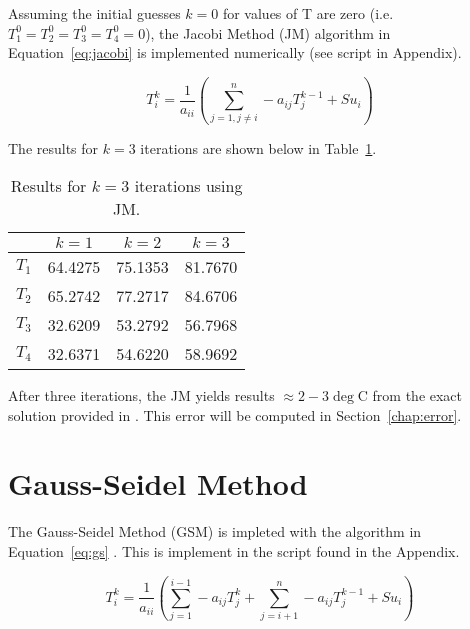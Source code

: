 Assuming the initial guesses $k=0$ for values of T are zero (i.e. $T_1^0=T_2^0=T_3^0=T_4^0=0$), the Jacobi Method (JM) algorithm in Equation~\ref{eq:jacobi} \cite{cfdbook} is implemented numerically (see script \cite{python} in Appendix).

\begin{equation}
	\label{eq:jacobi}	
	T_i^k = \frac{1}{a_{ii}} \left( \sum_{j=1, j \neq i}^{n} - a_{ij} T_j^{k-1}  + Su_i \right)
\end{equation}

The results for $k=3$ iterations are shown below in Table~\ref{tab:jac}.

\begin{table}[H]
  \centering
  \caption{Results for $k=3$ iterations using JM.}
    \begin{tabular}{cccc}
    \hline
    & \textbf{$k=1$} & \textbf{$k=2$} & \textbf{$k=3$} \\
    \midrule
    \textbf{$T_1$} & 64.4275 & 75.1353 & 81.7670 \\
    \textbf{$T_2$} & 65.2742 & 77.2717 & 84.6706 \\
    \textbf{$T_3$} & 32.6209 & 53.2792 & 56.7968 \\
    \textbf{$T_4$} & 32.6371 & 54.6220 & 58.9692 \\
    \hline
    \end{tabular}
  \label{tab:jac}
\end{table}

After three iterations, the JM yields results $\approx 2-3 \deg$C from the exact solution provided in \cite{assign}. This error will be computed in Section~\ref{chap:error}. \\

\chapter{Gauss-Seidel Method}
\label{chap:gauss}

The Gauss-Seidel Method (GSM) is impleted with the algorithm in Equation~\ref{eq:gs} \cite{cfdbook}. This is implement in the script found in the Appendix.

\begin{equation}
	\label{eq:gs}	
	T_i^k = \frac{1}{a_{ii}} \left( \sum_{j=1}^{i-1} - a_{ij} T_j^k  + \sum_{j=i+1}^{n} - a_{ij} T_j^{k-1} + Su_i \right)
\end{equation}

